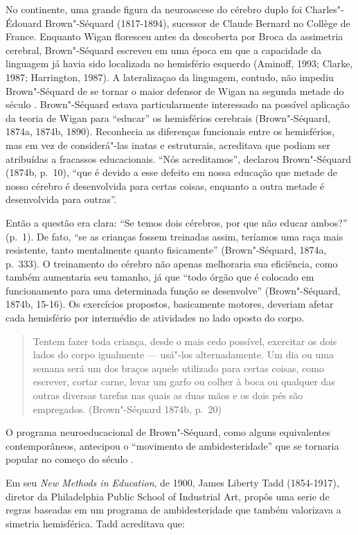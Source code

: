 No continente, uma grande figura da neuroascese do cérebro duplo foi
Charles"-Édouard Brown"-Séquard (1817-1894), sucessor de Claude Bernard no
Collège de France. Enquanto Wigan floresceu antes da descoberta por
Broca da assimetria cerebral, Brown"-Séquard escreveu em uma época em que
a capacidade da linguagem já havia sido localizada no hemisfério
esquerdo (Aminoff, 1993; Clarke, 1987; Harrington, 1987). A
lateralizaçao da linguagem, contudo, não impediu Brown"-Séquard de se
tornar o maior defensor de Wigan na segunda metade do século .
Brown"-Séquard estava particularmente interessado na possível aplicação
da teoria de Wigan para ``educar'' os hemisférios cerebrais
(Brown"-Séquard, 1874a, 1874b, 1890). Reconhecia as diferenças funcionais
entre os hemisférios, mas em vez de considerá"-las inatas e estruturais,
acreditava que podiam ser atribuídas a fracassos educacionais. ``Nós
acreditamos'', declarou Brown"-Séquard (1874b, p.~10), ``que é devido a
esse defeito em nossa educação que metade de nosso cérebro é
desenvolvida para certas coisas, enquanto a outra metade é desenvolvida
para outras''.

Então a questão era clara: ``Se temos dois cérebros, por que não educar
ambos?'' (p.~1). De fato, ``se as crianças fossem treinadas assim,
teríamos uma raça mais resistente, tanto mentalmente quanto
fisicamente'' (Brown"-Séquard, 1874a, p.~333). O treinamento do cérebro
não apenas melhoraria sua eficiência, como também aumentaria seu
tamanho, já que ``todo órgão que é colocado em funcionamento para uma
determinada função se desenvolve'' (Brown"-Séquard, 1874b, 15-16). Os
exercícios propostos, basicamente motores, deveriam afetar cada
hemisfério por intermédio de atividades no lado oposto do corpo.

\begin{quote}
Tentem fazer toda criança, desde o mais cedo possível, exercitar os dois
lados do corpo igualmente --- usá"-los alternadamente. Um dia ou uma
semana será um dos braços aquele utilizado para certas coisas, como
escrever, cortar carne, levar um garfo ou colher à boca ou qualquer das
outras diversas tarefas nas quais as duas mãos e os dois pés são
empregados. (Brown"-Séquard 1874b, p.~20)
\end{quote}

O programa neuroeducacional de Brown"-Séquard, como alguns equivalentes
contemporâneos, antecipou o ``movimento de ambidesteridade'' que se
tornaria popular no começo do século .

Em seu \emph{New Methods in Education}, de 1900, James Liberty Tadd
(1854-1917), diretor da Philadelphia Public School of Industrial Art,
propôs uma serie de regras baseadas em um programa de ambidesteridade
que também valorizava a simetria hemisférica. Tadd acreditava que:

